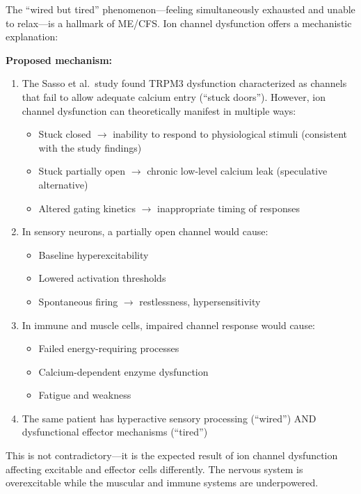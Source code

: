 \begin{hypothesis}
The ``wired but tired'' phenomenon---feeling simultaneously exhausted and unable to relax---is a hallmark of ME/CFS. Ion channel dysfunction offers a mechanistic explanation:

\textbf{Proposed mechanism:}
\begin{enumerate}
    \item The Sasso et al.\ study found TRPM3 dysfunction characterized as channels that fail to allow adequate calcium entry (``stuck doors''). However, ion channel dysfunction can theoretically manifest in multiple ways:
    \begin{itemize}
        \item Stuck closed $\rightarrow$ inability to respond to physiological stimuli (consistent with the study findings)
        \item Stuck partially open $\rightarrow$ chronic low-level calcium leak (speculative alternative)
        \item Altered gating kinetics $\rightarrow$ inappropriate timing of responses
    \end{itemize}
    \item In sensory neurons, a partially open channel would cause:
    \begin{itemize}
        \item Baseline hyperexcitability
        \item Lowered activation thresholds
        \item Spontaneous firing $\rightarrow$ restlessness, hypersensitivity
    \end{itemize}
    \item In immune and muscle cells, impaired channel response would cause:
    \begin{itemize}
        \item Failed energy-requiring processes
        \item Calcium-dependent enzyme dysfunction
        \item Fatigue and weakness
    \end{itemize}
    \item The same patient has hyperactive sensory processing (``wired'') AND dysfunctional effector mechanisms (``tired'')
\end{enumerate}

This is not contradictory---it is the expected result of ion channel dysfunction affecting excitable and effector cells differently. The nervous system is overexcitable while the muscular and immune systems are underpowered.
\end{hypothesis}

